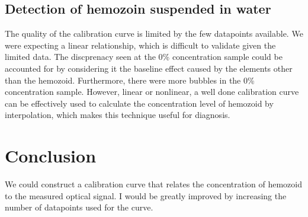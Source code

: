 \documentclass[12pt,a4paper]{article}
\begin{document}
\subsection{Detection of hemozoin suspended in water}


The quality of the calibration curve is limited by the few datapoints available. We were expecting a linear relationship, which is difficult to validate given the limited data. The discprenacy seen at the 0\% concentration sample could be accounted for by considering it the baseline effect caused by the elements other than the hemozoid. %
Furthermore, there were more bubbles in the 0\% concentration sample. However, linear or nonlinear, a well done calibration curve can be effectively used to calculate the concentration level of hemozoid by interpolation, which makes this technique useful for diagnosis.


\section{Conclusion}


We could construct a calibration curve that relates the concentration of hemozoid to the measured optical signal. I would be greatly improved by increasing the number of datapoints used for the curve.
\end{document}
